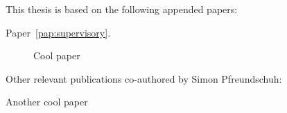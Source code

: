 
\begin{refsection}

This thesis is based on the following appended papers:

\begin{description}
\item[Paper~\ref{pap:supervisory}.] Cool paper
\end{description}

\vspace{1cm}

\noindent Other relevant publications co-authored by Simon Pfreundschuh:
\begin{description}
\normalsize
\newcommand{\ME}{{\bfseries Simon Pfreundschuh}}

\item Another cool paper
\end{description}

\end{refsection}
